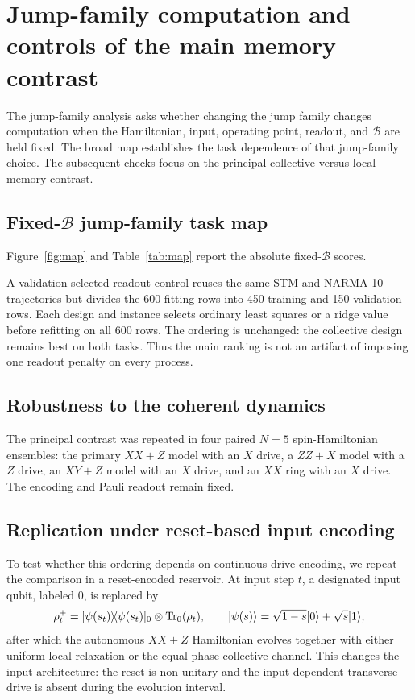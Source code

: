 \FloatBarrier
\section{Jump-family computation and controls of the main memory contrast}
\label{app:experiment1}

The jump-family analysis asks whether changing the jump family changes
computation when the Hamiltonian, input, operating point, readout, and
\(\mathcal B\) are held fixed.  The broad map establishes the task dependence
of that jump-family choice.  The subsequent checks focus on the principal
collective-versus-local memory contrast.

\subsection{Fixed-\texorpdfstring{\(\mathcal B\)}{B} jump-family task map}

Figure~\ref{fig:map} and Table~\ref{tab:map} report the absolute
fixed-\(\mathcal B\) scores.

A validation-selected readout control reuses the same STM and NARMA-10
trajectories but divides the 600 fitting rows into 450 training and 150
validation rows.  Each design and instance selects ordinary least squares or
a ridge value before refitting on all 600 rows.  The ordering is unchanged:
the collective design remains best on both tasks.  Thus the main ranking is
not an artifact of imposing one readout penalty on every process.

\subsection{Robustness to the coherent dynamics}

The principal contrast was repeated in four paired \(N=5\) spin-Hamiltonian
ensembles: the primary \(XX+Z\) model with an \(X\) drive, a \(ZZ+X\) model
with a \(Z\) drive, an \(XY+Z\) model with an \(X\) drive, and an \(XX\) ring
with an \(X\) drive. The encoding and Pauli readout remain fixed.

\subsection{Replication under reset-based input encoding}
\label{app:reset-architecture}

To test whether this ordering depends on continuous-drive encoding, we repeat
the comparison in a reset-encoded reservoir. At input step \(t\), a designated
input qubit, labeled 0, is replaced by
\[
 \rho_t^{+}
 = \lvert\psi(s_t)\rangle\!\langle\psi(s_t)\rvert_0
   \otimes \operatorname{Tr}_0(\rho_t),
 \qquad
 \lvert\psi(s)\rangle
 = \sqrt{1-s}\lvert0\rangle+\sqrt{s}\lvert1\rangle ,
\]
after which the autonomous \(XX+Z\) Hamiltonian evolves together with either
uniform local relaxation or the equal-phase collective channel. This changes
the input architecture: the reset is non-unitary and the input-dependent
transverse drive is absent during the evolution interval.

